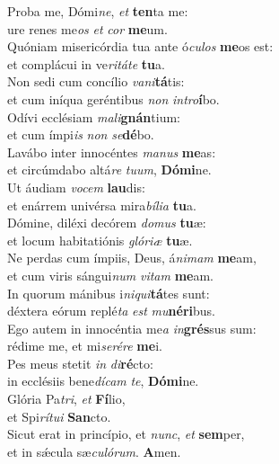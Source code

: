 \evenverse Proba me, Dómi\textit{ne}, \textit{et} \textbf{ten}ta me:~\*\\
\evenverse ure renes me\textit{os} \textit{et} \textit{cor} \textbf{me}um.\\
\oddverse Quóniam misericórdia tua ante ó\textit{cu}\textit{los} \textbf{me}os est:~\*\\
\oddverse et complácui in ve\textit{ri}\textit{tá}\textit{te} \textbf{tu}a.\\
\evenverse Non sedi cum concílio \textit{va}\textit{ni}\textbf{tá}tis:~\*\\
\evenverse et cum iníqua geréntibus \textit{non} \textit{in}\textit{tro}\textbf{í}bo.\\
\oddverse Odívi ecclésiam \textit{ma}\textit{li}\textbf{gnán}tium:~\*\\
\oddverse et cum ímpi\textit{is} \textit{non} \textit{se}\textbf{dé}bo.\\
\evenverse Lavábo inter innocéntes \textit{ma}\textit{nus} \textbf{me}as:~\*\\
\evenverse et circúmdabo altá\textit{re} \textit{tu}\textit{um}, \textbf{Dó}\textbf{mi}ne.\\
\oddverse Ut áudiam \textit{vo}\textit{cem} \textbf{lau}dis:~\*\\
\oddverse et enárrem univérsa mira\textit{bí}\textit{li}\textit{a} \textbf{tu}a.\\
\evenverse Dómine, diléxi decórem \textit{do}\textit{mus} \textbf{tu}æ:~\*\\
\evenverse et locum habitatiónis \textit{gló}\textit{ri}\textit{æ} \textbf{tu}æ.\\
\oddverse Ne perdas cum ímpiis, Deus, á\textit{ni}\textit{mam} \textbf{me}am,~\*\\
\oddverse et cum viris sángui\textit{num} \textit{vi}\textit{tam} \textbf{me}am.\\
\evenverse In quorum mánibus i\textit{ni}\textit{qui}\textbf{tá}tes sunt:~\*\\
\evenverse déxtera eórum replé\textit{ta} \textit{est} \textit{mu}\textbf{né}\textbf{ri}bus.\\
\oddverse Ego autem in innocéntia me\textit{a} \textit{in}\textbf{grés}sus sum:~\*\\
\oddverse rédime me, et mi\textit{se}\textit{ré}\textit{re} \textbf{me}i.\\
\evenverse Pes meus stetit \textit{in} \textit{di}\textbf{ré}cto:~\*\\
\evenverse in ecclésiis bene\textit{dí}\textit{cam} \textit{te}, \textbf{Dó}\textbf{mi}ne.\\
\oddverse Glória Pa\textit{tri}, \textit{et} \textbf{Fí}lio,~\*\\
\oddverse et Spi\textit{rí}\textit{tu}\textit{i} \textbf{San}cto.\\
\evenverse Sicut erat in princípio, et \textit{nunc}, \textit{et} \textbf{sem}per,~\*\\
\evenverse et in sǽcula sæ\textit{cu}\textit{ló}\textit{rum}. \textbf{A}men.\\
